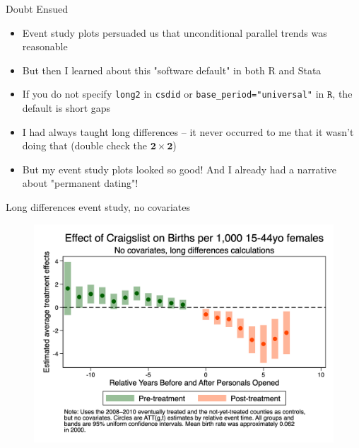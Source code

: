 \documentclass{beamer}
\begin{document}
\begin{frame}{Doubt Ensued}

\begin{itemize}

	\item Event study plots persuaded us that unconditional parallel trends was reasonable
	\item But then I learned about this "software default" in both R and Stata
	\item If you do not specify \texttt{long2} in \texttt{csdid} or \texttt{base_period="universal"} in $\texttt{R}$, the default is short gaps
	\item I had always taught long differences -- it never occurred to me that it wasn't doing that (double check the $\mathbf{2 \times 2}$)
	\item But my event study plots looked so good! And I already had a narrative about "permanent dating"!
	\end{itemize}
\end{frame}



\begin{frame}{Long differences event study, no covariates}

\begin{figure}
    \centering
    \includegraphics[height=0.85\textheight]{./lecture_includes/es_births_none}
\end{figure}

\end{frame}
\end{document}
